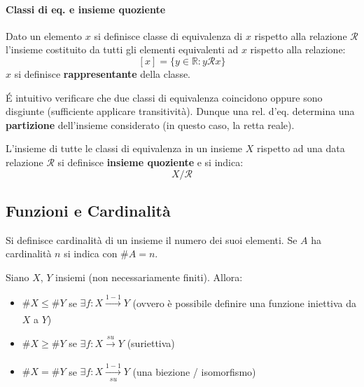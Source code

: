 \documentclass[10pt]{article}
\theoremstyle{plain}
\begin{document}
\paragraph{Classi di eq. e insieme quoziente}
\begin{defin}
    Dato un elemento $x$ si definisce classe di equivalenza di $x$ rispetto alla relazione $\mathcal{R}$ l'insieme costituito da tutti gli elementi equivalenti ad $x$ rispetto alla relazione:
    \[[x] = \{y \in \mathbb{R} : y\mathcal{R}x\}\]
    $x$ si definisce \textbf{rappresentante} della classe.
\end{defin}
\'E intuitivo verificare che due classi di equivalenza coincidono oppure sono disgiunte (sufficiente applicare transitività). Dunque una rel. d'eq. determina una \textbf{partizione} dell'insieme considerato (in questo caso, la retta reale).
\begin{defin}
    L'insieme di tutte le classi di equivalenza in un insieme $X$ rispetto ad una data relazione $\mathcal{R}$ si definisce \textbf{insieme quoziente} e si indica:
    \[X / \mathcal{R}\]
\end{defin}

\subsection{Funzioni e Cardinalità}
\begin{defin}
    Si definisce cardinalità di un insieme il numero dei suoi elementi. Se $A$ ha cardinalità $n$ si indica con $\# A = n$.
\end{defin}
\begin{prop}
    Siano $X$, $Y$ insiemi (non necessariamente finiti). Allora:
    \begin{itemize}[label = $\square$]
        \item $\#X \leq \#Y$ se $\exists f : X \xrightarrow[]{1-1} Y$ (ovvero è possibile definire una funzione iniettiva da $X$ a $Y$)
        \item $\#X \geq \#Y$ se $\exists f : X \xrightarrow[]{su} Y$ (suriettiva)
        \item $\#X = \#Y$ se $\exists f : X \xrightarrow[su]{1-1} Y$ (una biezione / isomorfismo)
    \end{itemize}
\end{prop}
\end{document}
